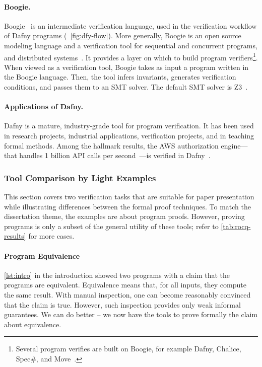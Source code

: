 \paragraph*{Boogie.}
{Boogie}~\cite{leino2008} is an intermediate verification language, used in the verification workflow of Dafny programs (\cf~\autoref{fig:dfy-flow}).
More generally, Boogie is an open source modeling language and a verification tool for sequential and concurrent programs, and distributed systems~\cite{boogie}.
It provides a layer on which to build program verifiers\footnote{
Several program verifies are built on Boogie, for example Dafny, Chalice, Spec\#, and Move~\cite{boogie}.}.
When viewed as a verification tool, Boogie takes as input a program written in the Boogie language.
Then, the tool infers invariants, generates verification conditions, and passes them to an SMT solver.
The default SMT solver is Z3~\cite{demoura2008}.

\paragraph*{Applications of Dafny.}
Dafny is a mature, industry-grade tool for program verification.
It has been used in research projects, industrial applications, verification projects, and in teaching formal methods.
Among the hallmark results, the AWS authorization engine---that handles 1 billion API calls per second~\cite{wagner2024}---is verified in Dafny~\cite{chakarov2025}.

\subsubsection{Tool Comparison by Light Examples}
\label{subsubsec:sm-tool-examples}

This section covers two verification tasks that are suitable for paper presentation while illustrating differences between the formal proof techniques.
To match the dissertation theme, the examples are about program proofs.
However, proving programs is only a subset of the general utility of these tools;
refer to \autoref{tab:rocq-results} for more cases.

\paragraph{Program Equivalence}

\autoref{lst:intro} in the introduction showed two programs with a claim that the programs are equivalent.
Equivalence means that, for all inputs, they compute the same result.
With manual inspection, one can become reasonably convinced that the claim is true.
However, such inspection provides only weak informal guarantees.
We can do better -- we now have the tools to prove formally the claim about equivalence.

